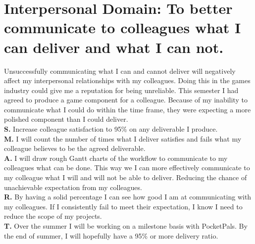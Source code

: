 \documentclass{scrartcl}
\begin{document}
\section{Interpersonal Domain: To better communicate to colleagues what I can deliver and what I can not.}
Unsuccessfully communicating what I can and cannot deliver will negatively affect my interpersonal relationships with my colleagues. Doing this in the games industry could give me a reputation for being unreliable. This semester I had agreed to produce a game component for a colleague. Because of my inability to communicate what I could do within the time frame, they were expecting a more polished component than I could deliver.  \\
\textbf{S.}   Increase colleague satisfaction to 95\% on any deliverable I  produce. \\
\textbf{M.}  I will count the number of times what I deliver satisfies and fails what my colleague believes to be the agreed deliverable.  \\
\textbf{A.}  I will draw rough Gantt charts of the workflow to communicate to my colleagues what can be done. This way we I can more effectively communicate to my colleague what I will and will not be able to deliver. Reducing the chance of unachievable expectation from my colleagues.\\
\textbf{R.}  By having a solid percentage I can see how good I am at communicating with my colleagues. If I consistently fail to meet their expectation, I know I need to reduce the scope of my projects. \\
\textbf{T.} Over the summer I will be working on a milestone basis with PocketPals. By the end of summer, I will hopefully have a 95\%  or more delivery ratio.\\
\end{document}
